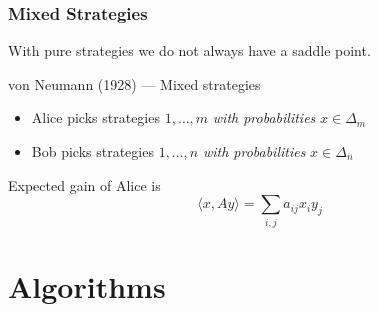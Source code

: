 \documentclass{beamer}
\begin{document}
\begin{frame}
  \frametitle{Mixed Strategies}
  With pure strategies we do not always have a saddle point.
  \begin{block}{von Neumann (1928) --- Mixed strategies}
    \begin{itemize}
      \item Alice picks strategies $1, \dots, m$ \emph{with probabilities} $x\in \Delta_m$
      \item Bob picks strategies $1, \dots, n$ \emph{with probabilities} $x\in \Delta_n$
    \end{itemize}
    Expected gain of Alice is
    \begin{equation}
      \langle x, Ay \rangle = \sum_{i,j} a_{ij} x_i y_j
    \end{equation}
  \end{block}
\end{frame}

\section{Algorithms}%
\label{sec:}
\end{document}
